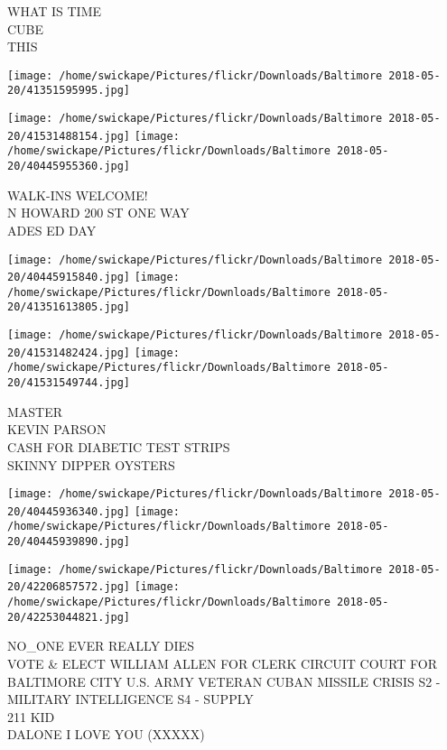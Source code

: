 \documentclass[10pt,letterpaper]{article}
\begin{document}
WHAT IS TIME\\
CUBE\\
THIS\\
\pagebreak

\texttt{[image: /home/swickape/Pictures/flickr/Downloads/Baltimore 2018-05-20/41351595995.jpg]}

\vspace{0.25in}
\texttt{[image: /home/swickape/Pictures/flickr/Downloads/Baltimore 2018-05-20/41531488154.jpg]}
\texttt{[image: /home/swickape/Pictures/flickr/Downloads/Baltimore 2018-05-20/40445955360.jpg]}

WALK{-}INS WELCOME!\\
N HOWARD 200 ST ONE WAY\\
ADES ED DAY\\
\pagebreak

\texttt{[image: /home/swickape/Pictures/flickr/Downloads/Baltimore 2018-05-20/40445915840.jpg]}
\texttt{[image: /home/swickape/Pictures/flickr/Downloads/Baltimore 2018-05-20/41351613805.jpg]}

\texttt{[image: /home/swickape/Pictures/flickr/Downloads/Baltimore 2018-05-20/41531482424.jpg]}
\texttt{[image: /home/swickape/Pictures/flickr/Downloads/Baltimore 2018-05-20/41531549744.jpg]}

MASTER\\
KEVIN PARSON\\
CASH FOR DIABETIC TEST STRIPS\\
SKINNY DIPPER OYSTERS\\
\pagebreak

\texttt{[image: /home/swickape/Pictures/flickr/Downloads/Baltimore 2018-05-20/40445936340.jpg]}
\texttt{[image: /home/swickape/Pictures/flickr/Downloads/Baltimore 2018-05-20/40445939890.jpg]}

\texttt{[image: /home/swickape/Pictures/flickr/Downloads/Baltimore 2018-05-20/42206857572.jpg]}
\texttt{[image: /home/swickape/Pictures/flickr/Downloads/Baltimore 2018-05-20/42253044821.jpg]}

NO\_ONE EVER REALLY DIES\\
VOTE \& ELECT WILLIAM ALLEN FOR CLERK CIRCUIT COURT FOR BALTIMORE CITY U.S. ARMY VETERAN CUBAN MISSILE CRISIS S2 {-} MILITARY INTELLIGENCE S4 {-} SUPPLY\\
211 KID\\
DALONE I LOVE YOU (XXXXX)\\
\pagebreak
\end{document}

